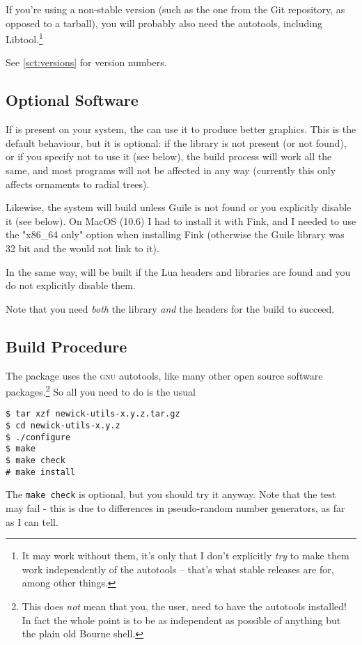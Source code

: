 If you're using a non-stable version (such as the one from the Git repository,
as opposed to a tarball), you will probably also need the \gnu{} autotools,
including Libtool.\footnote{It may work without them, it's only that I don't
explicitly \emph{try} to make them work independently of the autotools -- that's
what stable releases are for, among other things.}

See \ref{sct:versions} for version numbers.

\subsection{Optional Software}
\label{sct:optional}

\noindent{}If \libxml{} is present on your system, the \nutils{} can use it to
produce better \svg{} graphics. This is the default behaviour, but it is
optional: if the library is not present (or not found), or if you specify not to
use it (see below), the build process will work all the same, and most programs
will not be affected in any way (currently this only affects ornaments to
radial \svg{} trees).

Likewise, the system will build \sched{} unless Guile is not found or you
explicitly disable it (see below). On MacOS (10.6) I had to install it with
Fink, and I needed to use the "x86\_64 only" option when installing Fink
(otherwise the Guile library was 32 bit and the \nutils{} would not link to it).

In the same way, \luaed{} will be built if the Lua headers and libraries are
found and you do not explicitly disable them.

Note that you need \emph{both} the library \emph{and} the headers for the build
to succeed.

\subsection{Build Procedure}
\noindent{}The package uses the \textsc{gnu} autotools, like many other open source software packages.\footnote{This does \emph{not} mean that you, the user, need to have the autotools installed! In fact the whole point is to be as independent as possible of anything but the plain old Bourne shell.} So all you need to do is the usual
\begin{verbatim}
$ tar xzf newick-utils-x.y.z.tar.gz
$ cd newick-utils-x.y.z
$ ./configure
$ make
$ make check
# make install
\end{verbatim}
The \texttt{make check} is optional, but you should try it anyway. Note that
the \gen{} test may fail - this is due to differences in pseudo-random number
generators, as far as I can tell.


